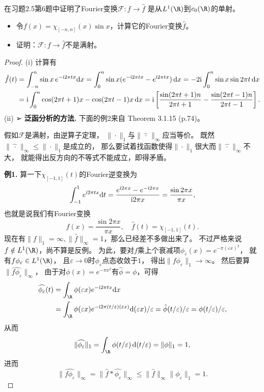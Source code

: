 \begin{7}
    在习题2.5第6题中证明了Fourier变换$\mathcal{F}:f\to\hat{f}$
    是从$L^1(\R)$到$c_0(\R)$的单射。
    \begin{itemize}
    \item[(i)] 令$f(x)=\chi_{[-n,n]}(x)\sin x$，计算它的Fourier变换$\hat{f}$。
    \item[(ii)] 证明：$\mathcal{F}:f\to\hat{f}$不是满射。
    \end{itemize}
\end{7}
\begin{proof}
    (i) 计算有
    \begin{align*}
        \hat{f}(t)&=\int_{-n}^n\sin x\,e^{-\mathrm{i}2\pi tx}{\rm d}x
        =\int_0^n\sin x(e^{-\mathrm{i}2\pi tx}-e^{\mathrm{i}2\pi tx})\,{\rm d}x
        =-2\mathrm{i}\int_0^n\sin x\sin2\pi t\,{\rm d}x\\
        &=\mathrm{i}\int_0^n\cos(2\pi t+1)x-\cos(2\pi t-1)x\,{\rm d}x
        =\mathrm{i}\left[\frac{\sin(2\pi t+1)n}{2\pi t+1}
        -\frac{\sin(2\pi t-1)n}{2\pi t-1}\right].
    \end{align*}
    (ii) ➢ \textbf{泛函分析的方法.} 下面的例2来自\cite{Da} Theorem 3.1.15 (p.74)。
    
    假如$\mathcal{F}$是满射，由逆算子定理，
    $\|\cdot\|_1$与$\|\hat{\,\cdot\,}\|_\infty$应当等价。
    既然$\|\hat{\,\cdot\,}\|_\infty\leqslant\|\cdot\|_1$是成立的，
    那么要试着找函数使得$\|\cdot\|_1$很大而$\|\hat{\,\cdot\,}\|_\infty$不大，
    就能得出反方向的不等式不能成立，即得矛盾。

    \textbf{例1.} 算一下$\chi_{[-1,1]}(t)$的Fourier逆变换为
    \[\int_{-1}^1e^{{\rm i}2\pi tx}{\rm d}t
    =\frac{e^{{\rm i}2\pi x}-e^{-{\rm i}2\pi x}}{{\rm i}2\pi x}
    =\frac{\sin2\pi x}{\pi x},\]
    也就是说我们有Fourier变换
    \[f(x)=\frac{\sin2\pi x}{\pi x},\quad\hat{f}(t)=\chi_{[-1,1]}(t).\]
    现在有$\|f\|_1=\infty,\|\hat{f}\|_\infty=1$，那么已经差不多做出来了。
    不过严格来说$f \notin L^1(\R)$，尚不算是反例。
    为此，要对$f$乘上个衰减项$\phi_\varepsilon(x)=e^{-\pi(\varepsilon x)^2}$，
    就有$f\phi_\varepsilon \in L^1(\R)$，
    且$\varepsilon\to0$时$\phi_\varepsilon$点态收敛于$1$，
    得出$\|f\phi_\varepsilon\|_1\to\infty$。
    然后要算$\|\widehat{f\phi_\varepsilon}\|_\infty$，
    由于对$\phi(x)=e^{-\pi x^2}$有$\hat{\phi}=\phi$，可得
    \begin{align}
        \widehat{\phi_\varepsilon}(t)&=\int_\R\phi(\varepsilon x)e^{-{\rm i}2\pi tx}{\rm d}x\\
        &=\int_\R\phi(\varepsilon x)e^{-{\rm i}2\pi(t/\varepsilon)(\varepsilon x)}{\rm d}(\varepsilon x)/\varepsilon
        =\hat{\phi}(t/\varepsilon)/\varepsilon=\phi(t/\varepsilon)/\varepsilon,
    \end{align}
    从而
    \[\|\widehat{\phi_\varepsilon}\|_1
    =\int_\R\phi(t/\varepsilon)\,{\rm d}(t/\varepsilon)=\|\phi\|_1=1,\]
    进而
    \[\|\widehat{f\phi_\varepsilon}\|_\infty
    =\|\hat{f}*\widehat{\phi_\varepsilon}\|_\infty
    \leqslant\|\hat{f}\|_\infty\|\widehat{\phi_\varepsilon}\|_1=1.\]


\end{proof}
